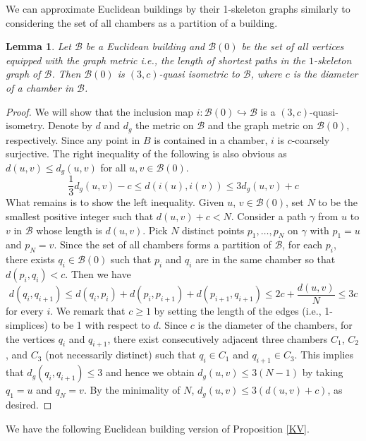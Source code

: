 \documentclass[letterpaper, reqno, 11pt]{amsart}
\newtheorem{lemma}[theorem]{Lemma}
\theoremstyle{definition}
\theoremstyle{definition}
\theoremstyle{remark}
\newcommand{\ga}{\gamma}
\newcommand{\cal}{\mathcal}
\begin{document}
We can approximate Euclidean buildings by their 1-skeleton graphs similarly to \cite[Proposition 8.45]{MR1744486} considering the set of all chambers as a partition of a building.
\begin{lemma}\label{skeleton}
    Let $\cal{B}$ be a Euclidean building and $\cal{B}(0)$ be the set of all vertices equipped with the graph metric i.e., the length of shortest paths in the $1$-skeleton graph of $\cal{B}$.
    Then $\cal{B}(0)$ is $(3,c)$-quasi isometric to $\cal{B}$, where $c$ is the diameter of a chamber in $\cal{B}$.
\end{lemma}
\begin{proof}
    We will show that the inclusion map $i: \cal{B}(0) \hookrightarrow \cal{B}$ is a $(3,c)$-quasi-isometry.
    Denote by $d$ and $d_{g}$ the metric on $\cal{B}$ and the graph metric on $\cal{B}(0)$, respectively.
    Since any point in $B$ is contained in a chamber, $i$ is $c$-coarsely surjective.
    The right inequality of the following is also obvious as $d(u,v) \leq d_g(u,v)$ for all $u,v \in \cal{B}(0)$.
    $$
    \frac{1}{3}d_g(u,v)-c \leq d(i(u),i(v)) \leq 3d_g(u,v)+c 
    $$
    What remains is to show the left inequality. Given $u$, $v \in \cal{B}(0)$, set $N$ to be the smallest positive integer such that $d(u,v)+c < N$.
    Consider a path $\ga$ from $u$ to $v$ in $\cal{B}$ whose length is $d(u,v)$.  Pick $N$ distinct points $p_1, \dots ,p_N $ on $\ga$ with $p_1=u$ and $p_{N}=v$. Since the set of all chambers forms a partition of $\cal{B}$, for each $p_i$, there exists $q_i \in \cal{B}(0)$ such that $p_i$ and $q_i$ are in the same chamber so that $d(p_i,q_i)<c$.
    Then we have 
    $$
    d(q_i,q_{i+1}) \leq d(q_i,p_i)+d(p_i,p_{i+1})+d(p_{i+1},q_{i+1})
    \leq 2c + \frac{d(u,v)}{N} \leq 3c 
    $$
    for every $i$. We remark that $c \geq 1$ by setting the length of the edges (i.e., 1-simplices) to be 1 with respect to $d$.
    Since $c$ is the diameter of the chambers,
    for the vertices $q_i$ and $q_{i+1}$, there exist consecutively adjacent three chambers $C_1$, $C_2$, and $C_3$ (not necessarily distinct) such that $q_i \in C_1$ and $q_{i+1} \in C_3$.
    This implies that $d_g(q_i,q_{i+1}) \leq 3 $ 
    and hence we obtain $d_g(u,v)\leq 3(N-1)$ by taking $q_1=u$ and $q_{N}=v$.
    By the minimality of $N$, $d_g(u,v) \leq 3(d(u,v)+c)$, as desired.  
\end{proof}




We have the following Euclidean building version of Proposition \ref{KV}.
\end{document}
